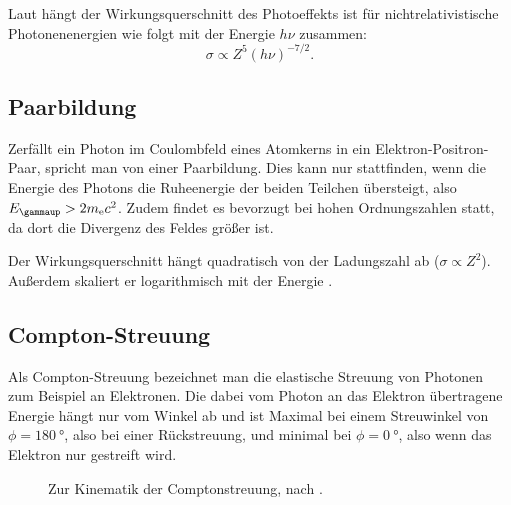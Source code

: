 \documentclass[11pt, ngerman, fleqn, DIV=15, headinclude, BCOR=2cm]{scrreprt}
\begin{document}
Laut \parencite[(2,103)]{Leo/Techniques_Nuclear_Experiments} hängt der
Wirkungsquerschnitt des Photoeffekts ist für nichtrelativistische
Photonenenergien wie folgt mit der Energie $h\nu$ zusammen:
\[
    \sigma \propto Z^5 (h\nu)^{-7/2}.
\]

\subsection{Paarbildung}

Zerfällt ein Photon im Coulombfeld eines Atomkerns in ein
Elektron-Positron-Paar, spricht man von einer Paarbildung. Dies kann nur
stattfinden, wenn die Energie des Photons die Ruheenergie der beiden Teilchen
übersteigt, also $E_\gammaup > 2m_\mathrm{e}c^2$. Zudem findet es bevorzugt bei
hohen Ordnungszahlen statt, da dort die Divergenz des Feldes größer ist.

Der Wirkungsquerschnitt hängt quadratisch von der Ladungszahl ab ($\sigma
\propto Z^2$). Außerdem skaliert er logarithmisch mit der Energie
\parencite[(17.15)]{meschede-gerthsen_24}
\parencite[(2.120)]{Leo/Techniques_Nuclear_Experiments}.

\subsection{Compton-Streuung}

Als Compton-Streuung bezeichnet man die elastische Streuung von Photonen zum
Beispiel an Elektronen. Die dabei vom Photon an das Elektron übertragene
Energie hängt nur vom Winkel ab und ist Maximal bei einem Streuwinkel von $\phi
= \SI{180}\degree$, also bei einer Rückstreuung, und minimal bei $\phi =
\SI{0}\degree$, also wenn das Elektron nur gestreift wird.

\begin{figure}[htbp]
    \centering
    \caption{%
        Zur Kinematik der Comptonstreuung, nach
        \parencite[Abbildung~2.22]{Leo/Techniques_Nuclear_Experiments}.
    }
    \label{fig:}
\end{figure}
\end{document}
